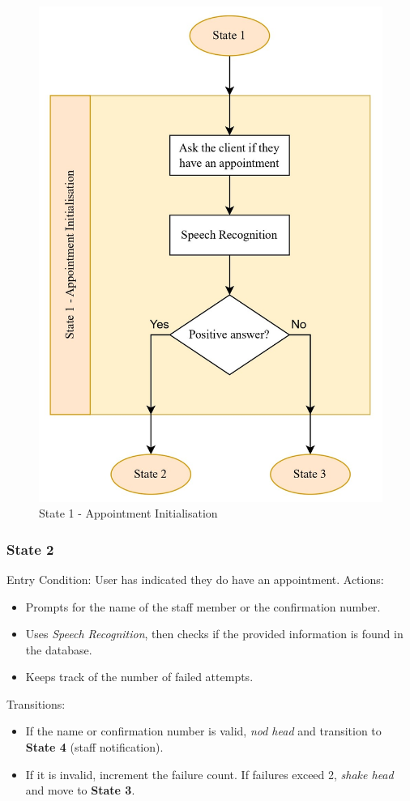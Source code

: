 \documentclass[conference]{IEEEtran}
\begin{document}
\begin{figure}
    \centering
    \includegraphics[width=.6\linewidth]{State 1 - Appointment Initialisation.jpg}
    \caption{State 1 - Appointment Initialisation}
    \label{State 1 - Appointment Initialisation}
\end{figure}

\subsubsection{State 2}
Entry Condition:
User has indicated they do have an appointment.
Actions:
\begin{itemize}
  \item Prompts for the name of the staff member or the confirmation number.
  \item Uses \emph{Speech Recognition}, then checks if the provided information is found in the database.
  \item Keeps track of the number of failed attempts.
\end{itemize}
Transitions:
\begin{itemize}
  \item If the name or confirmation number is valid, \emph{nod head} and transition to \textbf{State 4} (staff notification).
  \item If it is invalid, increment the failure count. If failures exceed 2, \emph{shake head} and move to \textbf{State 3}.
\end{itemize}
\end{document}
